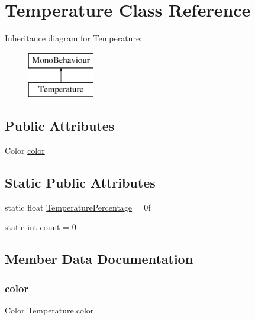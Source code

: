 \hypertarget{class_temperature}{}\section{Temperature Class Reference}
\label{class_temperature}
Inheritance diagram for Temperature\+:\begin{figure}[H]
\begin{center}
\leavevmode
\includegraphics[height=2.000000cm]{class_temperature}
\end{center}
\end{figure}
\subsection*{Public Attributes}
\begin{DoxyCompactItemize}
\item 
Color \hyperlink{class_temperature_a84329262cebb80bde1fe9608aa5f306d}{color}
\end{DoxyCompactItemize}
\subsection*{Static Public Attributes}
\begin{DoxyCompactItemize}
\item 
static float \hyperlink{class_temperature_a631500a94ef716115d7d9a7a48e8c49b}{Temperature\+Percentage} = 0f
\item 
static int \hyperlink{class_temperature_ae3b2a2151d7587733937039a94497a19}{count} = 0
\end{DoxyCompactItemize}


\subsection{Member Data Documentation}
\mbox{\label{class_temperature_a84329262cebb80bde1fe9608aa5f306d}} 
\subsubsection{\texorpdfstring{color}{color}}
{\footnotesize\ttfamily Color Temperature.\+color}

